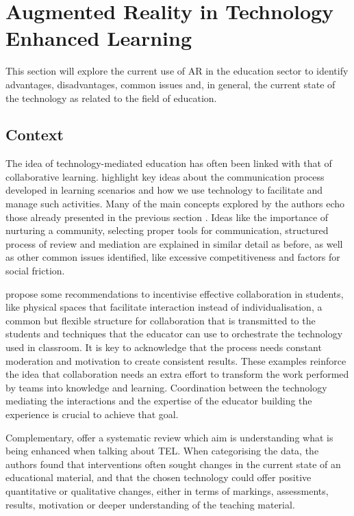 \section{Augmented Reality in Technology Enhanced Learning \label{sec:2-2}}

This section will explore the current use of \ac{AR} in the education sector to identify advantages, disadvantages, common issues and, in general, the current state of the technology as related to the field of education.

\subsection{Context \label{sec:2-2-1}}

The idea of technology-mediated education has often been linked with that of collaborative learning. \textcite{lehtinen_1999} highlight key ideas about the communication process developed in learning scenarios and how we use technology to facilitate and manage such activities. Many of the main concepts explored
by the authors echo those already presented in the previous section . Ideas like the importance of nurturing a community, selecting proper tools for communication, structured process of review and mediation are explained in similar detail as before, as well as other common issues identified, like excessive
competitiveness and factors for social friction.

\textcite{dillenbourg_2007} propose some recommendations to incentivise effective collaboration in students, like physical spaces that facilitate interaction instead of individualisation, a common but flexible structure for collaboration that is transmitted to the students and techniques that the educator can use
to orchestrate the technology used in classroom. It is key to acknowledge that the process needs constant moderation and motivation to create consistent results. These examples reinforce the idea that collaboration needs an extra effort to transform the work performed by teams into knowledge and learning.
Coordination between the technology mediating the interactions and the expertise of the educator building the experience is crucial to achieve that goal.

Complementary, \textcite{kirkwood_2014} offer a systematic review which aim is understanding what is being enhanced when talking about \ac{TEL}. When categorising the data, the authors found that interventions often sought changes in the current state of an educational material, and that the chosen technology could
offer positive quantitative or qualitative changes, either in terms of markings, assessments, results, motivation or deeper understanding of the teaching material.

